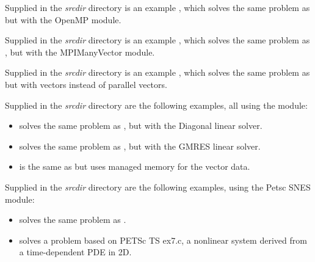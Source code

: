 \vspace{0.2in}\noindent Supplied in the
{\em srcdir} directory is an example
, which solves the same problem as
 but with the OpenMP {\nvector} module.

\vspace{0.2in}\noindent Supplied in the
{\em srcdir} directory is an example
, which solves the same problem as
, but with the MPIManyVector module.

\vspace{0.2in}\noindent Supplied in the
{\em srcdir} directory is an example
, which solves the same problem as
 but with {\hypre} vectors instead of
{\sundials} parallel vectors.

\vspace{0.2in}\noindent Supplied in the
{\em srcdir} directory are the following
examples, all using the  {\nvector} module:
\begin{itemize}
\item {} solves the same problem as
  , but with the Diagonal linear solver.
\item {} solves the same problem as
  , but with the GMRES linear solver.
\item {} is the same as
   but uses managed memory for the vector data.
\end{itemize}

\vspace{0.2in}\noindent Supplied in the
{\em srcdir} directory are the following
examples, using the Petsc SNES module:
\begin{itemize}
\item {} solves the same problem as
  .
\item {} solves a problem based on PETSc TS ex7.c, a
  nonlinear system derived from a time-dependent PDE in 2D.
\end{itemize}

